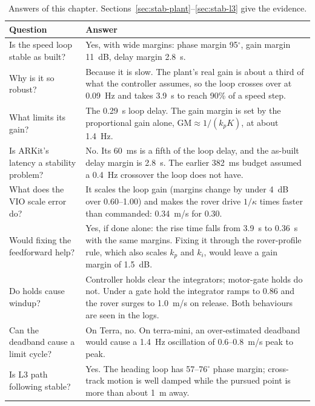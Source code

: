 \begin{table}[ht]
\centering
\caption{Answers of this chapter. Sections~\ref{sec:stab-plant}--\ref{sec:stab-l3} give the evidence.}
\label{tab:stab-answers}
\small
\begin{tabularx}{\textwidth}{@{}>{\raggedright\arraybackslash}p{} X@{}}
\toprule
Question & Answer \\
\midrule
Is the speed loop stable as built? & Yes, with wide margins: phase margin 95$^\circ$, gain margin 11~dB, delay margin 2.8~s. \\
Why is it so robust? & Because it is slow. The plant's real gain is about a third of what the controller assumes, so the loop crosses over at 0.09~Hz and takes 3.9~s to reach 90\% of a speed step. \\
What limits its gain? & The 0.29~s loop delay. The gain margin is set by the proportional gain alone, $\mathrm{GM} \approx 1/(k_p K)$, at about 1.4~Hz. \\
Is ARKit's latency a stability problem? & No. Its 60~ms is a fifth of the loop delay, and the as-built delay margin is 2.8~s. The earlier 382~ms budget assumed a 0.4~Hz crossover the loop does not have. \\
What does the VIO scale error do? & It scales the loop gain (margins change by under 4~dB over 0.60--1.00) and makes the rover drive $1/\kappa$ times faster than commanded: 0.34~m/s for 0.30. \\
Would fixing the feedforward help? & Yes, if done alone: the rise time falls from 3.9~s to 0.36~s with the same margins. Fixing it through the rover-profile rule, which also scales $k_p$ and $k_i$, would leave a gain margin of 1.5~dB. \\
Do holds cause windup? & Controller holds clear the integrators; motor-gate holds do not. Under a gate hold the integrator ramps to 0.86 and the rover surges to 1.0~m/s on release. Both behaviours are seen in the logs. \\
Can the deadband cause a limit cycle? & On Terra, no. On terra-mini, an over-estimated deadband would cause a 1.4~Hz oscillation of 0.6--0.8~m/s peak to peak. \\
Is L3 path following stable? & Yes. The heading loop has 57--76$^\circ$ phase margin; cross-track motion is well damped while the pursued point is more than about 1~m away. \\
\bottomrule
\end{tabularx}
\end{table}

